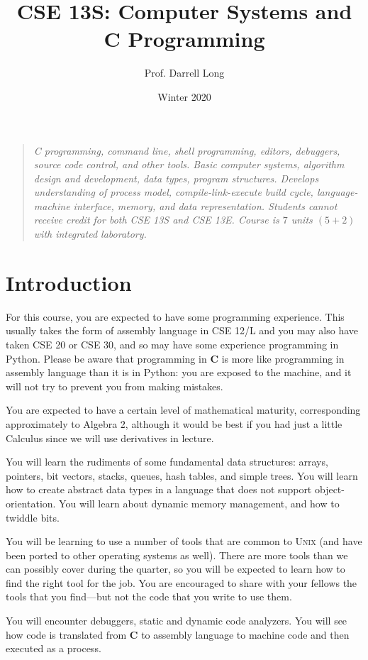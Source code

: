 \documentclass{article}
\title{CSE 13S: Computer Systems and \textbf{C} Programming}
\author{Prof.\xspace Darrell Long}
\date{Winter 2020}
\begin{document}
\maketitle
\begin{quotation}
\emph{
C programming, command line, shell programming, editors, debuggers,
source code control, and other tools. Basic computer systems,
algorithm design and development, data types, program structures.
Develops understanding of process model, compile-link-execute build
cycle, language-machine interface, memory, and data representation.
Students cannot receive credit for both CSE 13S and CSE 13E. Course
is $7$ units $(5 + 2)$ with integrated laboratory.
}
\end{quotation}

\section{Introduction}

For this course, you are expected to have some programming experience.
This usually takes the form of assembly language in CSE 12/L and you may
also have taken CSE 20 or CSE 30, and so may have some experience programming
in Python. Please be aware that programming in \textbf{C} is more
like programming in assembly language than it is in Python: you are
exposed to the machine, and it will not try to prevent you from
making mistakes.

You are expected to have a certain level of mathematical maturity,
corresponding approximately to Algebra 2, although it would be best if you had
just a little Calculus since we will use derivatives in lecture.

You will learn the rudiments of some fundamental data structures: arrays,
pointers, bit vectors, stacks, queues, hash tables, and simple trees. You will
learn how to create abstract data types in a language that does not support
object-orientation. You will learn about dynamic memory management, and how to
twiddle bits.

You will be learning to use a number of tools that are common to \textsc{Unix}
(and have been ported to other operating systems as well). There are more
tools than we can possibly cover during the quarter, so you will be expected
to learn how to find the right tool for the job. You are encouraged to share
with your fellows the tools that you find---but not the code that you write to
use them.

You will encounter debuggers, static and dynamic code analyzers. You will see
how code is translated from \textbf{C} to assembly language to machine code
and then executed as a process.
\end{document}
